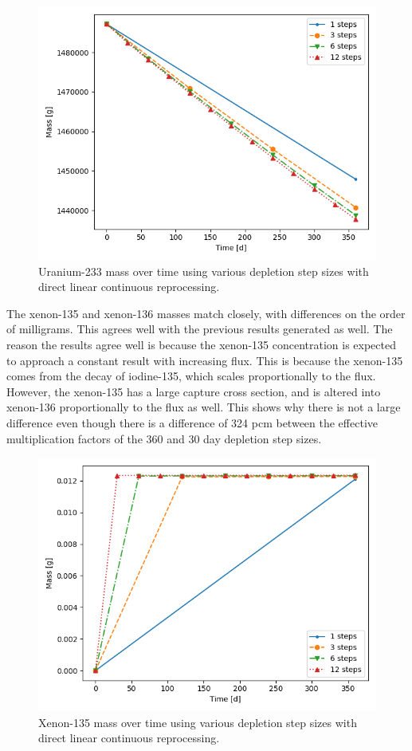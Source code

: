 \begin{figure}[H]
  \centering
  \includegraphics[scale=0.5]{images/DL_NSTEP_U-233_mass-large.png}
  \caption{Uranium-233 mass over time using various depletion step sizes with direct linear continuous reprocessing.}
   \label{fig:DL-cont-u-2}
\end{figure}

The xenon-135 and xenon-136 masses match closely, with differences on the order of milligrams. This agrees well with the previous results generated as well. The reason the results agree well is because the xenon-135 concentration is expected to approach a constant result with increasing flux. This is because the xenon-135 comes from the decay of iodine-135, which scales proportionally to the flux. However, the xenon-135 has a large capture cross section, and is altered into xenon-136 proportionally to the flux as well. This shows why there is not a large difference even though there is a difference of 324 pcm between the effective multiplication factors of the 360 and 30 day depletion step sizes.

\begin{figure}[H]
  \centering
  \includegraphics[scale=0.5]{images/DL_NSTEP_Xe-135_mass-large.png}
  \caption{Xenon-135 mass over time using various depletion step sizes with direct linear continuous reprocessing.}
   \label{fig:DL-cont-xe135-2}
\end{figure}

